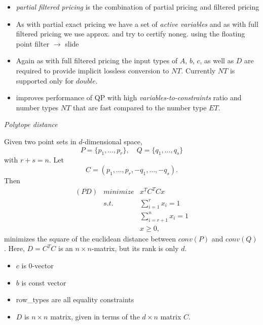 \documentclass{slides}
\begin{document}
\begin{note}
\begin{itemize}
\item \emph{partial filtered pricing} is the combination of partial pricing
and filtered pricing
\item As with partial exact pricing we have a set of \emph{active variables} and
as with full filtered pricing we use approx. and try to certify noneg. using
the floating point filter $\rightarrow$ slide
\item Again as with full filtered pricing the input types of $A$, $b$, $c$,
as well as $D$ are required to provide implicit lossless conversion to $NT$.
Currently $NT$ is supported only for $double$. 
\item improves performance of QP with high \emph{variables-to-constraints}
ratio and number types $NT$ that are fast compared to the number type $ET$.
\end{itemize}
\end{note}


\begin{slide}
\emph{Polytope distance}

Given two point sets in $d$-dimensional space,
\[
P=\{p_{1}, \ldots, p_{r} \},
\quad
Q=\{q_{1}, \ldots, q_{s} \}
\]
with $r+s=n$. Let
\[
C=(p_{1}, \ldots , p_{r}, -q_{1}, \ldots, -q_{s}).
\]
Then 
\begin{eqnarray*}
(PD) & minimize & x^{T}C^{T}Cx  \\
     & s.t.     & \sum_{i=1}^{r}x_{i} = 1 \\
     &          & \sum_{i=r+1}^{n}x_{i} = 1 \\
     &          & x \geq 0,
\end{eqnarray*}
minimizes the square of the euclidean distance between $conv(P)$ and $conv(Q)$.
Here, $D=C^{T}C$ is an
$n \times n$-matrix, but its rank is only $d$.
\end{slide}

\begin{note}
\begin{itemize}
\item $c$ is $0$-vector
\item $b$ is const vector
\item row\_types are all equality constraints
\item $D$ is $n \times n$ matrix, given in terms of the $d \times n$
matrix $C$.  
\end{itemize}
\end{note}
\end{document}
